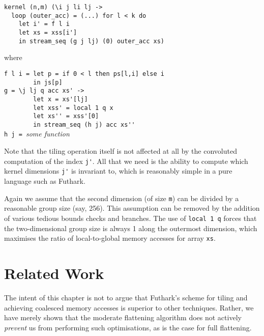 \begin{lstlisting}
kernel (n,m) (\i j li lj ->
  loop (outer_acc) = (...) for l < k do
    let i' = f l i
    let xs = xss[i']
    in stream_seq (g j lj) (0) outer_acc xs)
\end{lstlisting}
\begin{minipage}[t]{0.1\linewidth}
  \begin{flushright}
    where
  \end{flushright}
\end{minipage}
\begin{minipage}[t]{0.8\linewidth}
\lstinline{f l i = let p = if 0 < l then ps[l,i] else i}\\
\lstinline{        in js[p]}\\
\lstinline{g = \j lj q acc xs' ->}\\
\lstinline{        let x = xs'[lj]}\\
\lstinline{        let xss' = local 1 q x}\\
\lstinline{        let xs'' = xss'[0]}\\
\lstinline{        in stream_seq (h j) acc xs''}\\
\lstinline{h j = }\textit{some function}
\end{minipage}
\vspace{1em}

Note that the tiling operation itself is not affected at all by the
convoluted computation of the index \lstinline{j'}.  All that we need
is the ability to compute which kernel dimensions \lstinline{j'} is
invariant to, which is reasonably simple in a pure language such as
Futhark.

Again we assume that the second dimension (of size \texttt{m}) can be
divided by a reasonable group size (say, 256).  This assumption can be
removed by the addition of various tedious bounds checks and branches.
The use of \lstinline{local 1 q} forces that the two-dimensional group
size is always 1 along the outermost dimension, which maximises the
ratio of local-to-global memory accesses for array \lstinline{xs}.

\section{Related Work}

The intent of this chapter is not to argue that Futhark's scheme for
tiling and achieving coalesced memory accesses is superior to other
techniques.  Rather, we have merely shown that the moderate flattening
algorithm does not actively \textit{prevent} us from performing such
optimisations, as is the case for full flattening.

